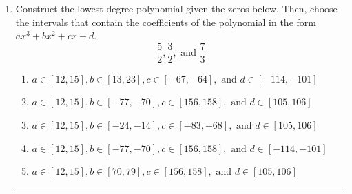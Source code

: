 \documentclass[14pt]{extbook}
\newcommand{\litem}[1]{\item#1\hspace*{-1cm}\rule{\textwidth}{0.4pt}}
\begin{document}
\begin{enumerate}
\litem{
Construct the lowest-degree polynomial given the zeros below. Then, choose the intervals that contain the coefficients of the polynomial in the form $ax^3+bx^2+cx+d$.\[ \frac{5}{2}, \frac{3}{2}, \text{ and } \frac{7}{3} \]\begin{enumerate}[label=\Alph*.]
\item \( a \in [12, 15], b \in [13, 23], c \in [-67, -64], \text{ and } d \in [-114, -101] \)
\item \( a \in [12, 15], b \in [-77, -70], c \in [156, 158], \text{ and } d \in [105, 106] \)
\item \( a \in [12, 15], b \in [-24, -14], c \in [-83, -68], \text{ and } d \in [105, 106] \)
\item \( a \in [12, 15], b \in [-77, -70], c \in [156, 158], \text{ and } d \in [-114, -101] \)
\item \( a \in [12, 15], b \in [70, 79], c \in [156, 158], \text{ and } d \in [105, 106] \)


\end{enumerate}}
\end{enumerate}
\end{document}

